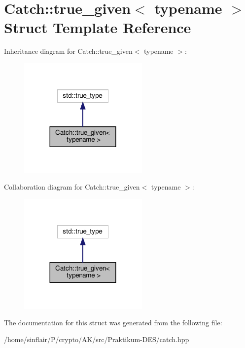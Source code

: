 \hypertarget{structCatch_1_1true__given}{}\section{Catch\+:\+:true\+\_\+given$<$ typename $>$ Struct Template Reference}
\label{structCatch_1_1true__given}


Inheritance diagram for Catch\+:\+:true\+\_\+given$<$ typename $>$\+:
\nopagebreak
\begin{figure}[H]
\begin{center}
\leavevmode
\includegraphics[width=180pt]{structCatch_1_1true__given__inherit__graph}
\end{center}
\end{figure}


Collaboration diagram for Catch\+:\+:true\+\_\+given$<$ typename $>$\+:
\nopagebreak
\begin{figure}[H]
\begin{center}
\leavevmode
\includegraphics[width=180pt]{structCatch_1_1true__given__coll__graph}
\end{center}
\end{figure}


The documentation for this struct was generated from the following file\+:\begin{DoxyCompactItemize}
\item 
/home/sinflair/\+P/crypto/\+A\+K/src/\+Praktikum-\/\+D\+E\+S/catch.\+hpp\end{DoxyCompactItemize}
